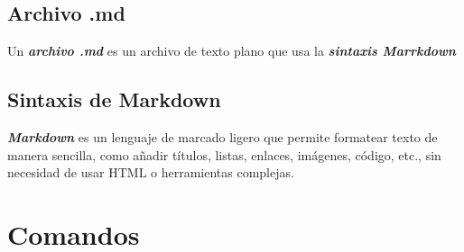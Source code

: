 \documentclass[10pt,a4paper]{book}
\begin{document}
\section{Archivo .md}
Un \textbf{\textit{archivo .md}} es un archivo de texto plano que usa la \textbf{\textit{sintaxis Marrkdown}}

\section{Sintaxis de Markdown}
\textbf{\textit{Markdown}} es un lenguaje de marcado ligero que permite formatear texto de manera sencilla, como añadir títulos, listas, enlaces, imágenes, código, etc., sin necesidad de usar HTML o herramientas complejas.

\newpage
\chapter{Comandos}
\newpage
\end{document}
